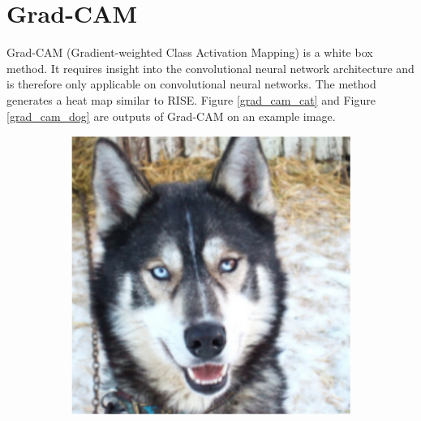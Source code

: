 \section{Grad-CAM}
Grad-CAM \cite{selvaraju2017grad} (Gradient-weighted Class Activation Mapping) is a white box method. It requires insight into the convolutional neural network architecture and is therefore only applicable on convolutional neural networks. The method generates a heat map similar to RISE. Figure \ref{grad_cam_cat} and Figure \ref{grad_cam_dog} are outputs of Grad-CAM on an example image.
\captionsetup[figure]{font=Large,labelfont=Large}
\begin{figure}[H]
    \centering
    \begin{subfigure}{.5\textwidth}
        \centering
        \caption{}
        \includegraphics[width=0.95\linewidth]{images/wolf.png}
    \end{subfigure}%
    \begin{subfigure}{.5\textwidth}
        \centering
        \caption{}

\end{subfigure}
\end{figure}
